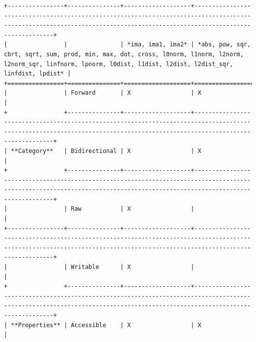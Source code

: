 \begin{verbatim}
+----------------+---------------+-------------------+--------------------------------------------------------------------------------------------------------------------------------------------------------------------------+
|                |               | *ima, ima1, ima2* | *abs, pow, sqr, cbrt, sqrt, sum, prod, min, max, dot, cross, l0norm, l1norm, l2norm, l2norm_sqr, linfnorm, lpnorm, l0dist, l1dist, l2dist, l2dist_sqr, linfdist, lpdist* |
+================+===============+===================+==========================================================================================================================================================================+
|                | Forward       | X                 | X                                                                                                                                                                        |
+                +---------------+-------------------+--------------------------------------------------------------------------------------------------------------------------------------------------------------------------+
| **Category**   | Bidirectional | X                 | X                                                                                                                                                                        |
+                +---------------+-------------------+--------------------------------------------------------------------------------------------------------------------------------------------------------------------------+
|                | Raw           | X                 |                                                                                                                                                                          |
+----------------+---------------+-------------------+--------------------------------------------------------------------------------------------------------------------------------------------------------------------------+
|                | Writable      | X                 |                                                                                                                                                                          |
+                +---------------+-------------------+--------------------------------------------------------------------------------------------------------------------------------------------------------------------------+
| **Properties** | Accessible    | X                 | X                                                                                                                                                                        |

\end{verbatim}
